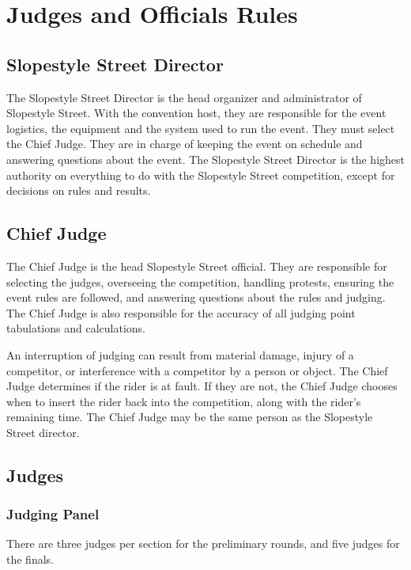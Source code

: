 \chapter{Judges and Officials Rules}

\section{Slopestyle Street Director}

The Slopestyle Street Director is the head organizer and administrator of Slopestyle Street.
With the convention host, they are responsible for the event logistics, the equipment and the system used to run the event.
They must select the Chief Judge.
They are in charge of keeping the event on schedule and answering questions about the event.
The Slopestyle Street Director is the highest authority on everything to do with the Slopestyle Street competition, except for decisions on rules and results.

\section{Chief Judge}

The Chief Judge is the head Slopestyle Street official.
They are responsible for selecting the judges, overseeing the competition, handling protests, ensuring the event rules are followed, and answering questions about the rules and judging.
The Chief Judge is also responsible for the accuracy of all judging point tabulations and calculations.

An interruption of judging can result from material damage, injury of a competitor, or interference with a competitor by a person or object.
The Chief Judge determines if the rider is at fault.
If they are not, the Chief Judge chooses when to insert the rider back into the competition, along with the rider's remaining time.
The Chief Judge may be the same person as the Slopestyle Street director.

\section{Judges}

\subsection{Judging Panel}

There are three judges per section for the preliminary rounds, and five judges for the finals.

